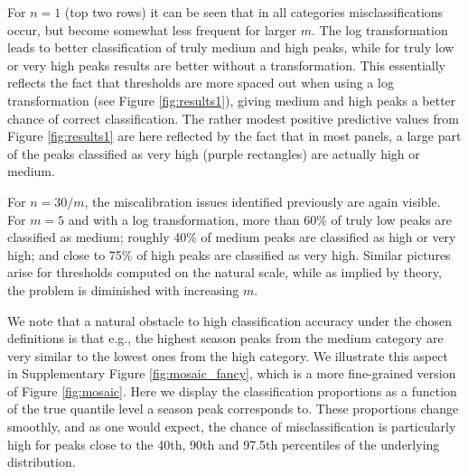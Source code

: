 \documentclass{article}
\begin{document}
For $n = 1$ (top two rows) it can be seen that in all categories misclassifications occur, but become somewhat less frequent for larger $m$. The log transformation leads to better classification of truly medium and high peaks, while for truly low or very high peaks results are better without a transformation. This essentially reflects the fact that thresholds are more spaced out when using a log transformation (see Figure \ref{fig:results1}), giving medium and high peaks a better chance of correct classification. The rather modest positive predictive values from Figure \ref{fig:results1} are here reflected by the fact that in most panels, a large part of the peaks classified as very high (purple rectangles) are actually high or medium.

For $n = 30/m$, the miscalibration issues identified previously are again visible. For $m = 5$ and with a log transformation, more than 60\% of truly low peaks are classified as medium; roughly 40\% of medium peaks are classified as high or very high; and close to 75\% of high peaks are classified as very high. Similar pictures arise for thresholds computed on the natural scale, while as implied by theory, the problem is diminished with increasing $m$.

We note that a natural obstacle to high classification accuracy under the chosen definitions is that e.g., the highest season peaks from the medium category are very similar to the lowest ones from the high category. We illustrate this aspect in Supplementary Figure \ref{fig:mosaic_fancy}, which is a more fine-grained version of Figure \ref{fig:mosaic}. Here we display the classification proportions as a function of the true quantile level a season peak corresponds to. These proportions change smoothly, and as one would expect, the chance of misclassification is particularly high for peaks close to the 40th, 90th and 97.5th percentiles of the underlying distribution.
\end{document}
